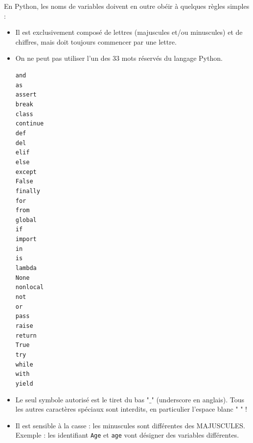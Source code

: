 \documentclass[11pt, a4paper]{book}
\begin{document}
\begin{important}
	En Python, les noms de variables doivent en outre obéir à quelques règles simples :\\
	\begin{itemize}
		\item Il est exclusivement composé de lettres (majuscules  et/ou minuscules) et de chiffres, mais doit toujours	commencer par une lettre.
		\item On ne peut pas utiliser l’un des 33 mots réservés du langage Python.
		\begin{multicols}{7}
			\lstinline{and}\\      \lstinline{as}\\         \lstinline{assert}\\      \lstinline{break}\\       \lstinline{class}\\       \lstinline{continue}\\       \lstinline{def}\\
			\lstinline{del}\\       \lstinline{elif}\\       \lstinline{else}\\        \lstinline{except}\\      \lstinline{False}\\       \lstinline{finally}\\        \lstinline{for}\\
			\lstinline{from}\\      \lstinline{global}\\     \lstinline{if}\\          \lstinline{import}\\      \lstinline{in}\\          \lstinline{is}\\             \lstinline{lambda}\\
			\lstinline{None}\\      \lstinline{nonlocal}\\   \lstinline{not}\\         \lstinline{or}\\          \lstinline{pass}\\        \lstinline{raise}\\          \lstinline{return}\\
			\lstinline{True}\\      \lstinline{try}\\        \lstinline{while}\\     \lstinline{with}\\ \lstinline{yield}
		\end{multicols}	
		\item Le seul symbole autorisé est le tiret du bas "$\_$" (underscore en anglais).
		Tous les autres caractères spéciaux sont interdits, en particulier l’espace blanc " " !
		\item Il est sensible à la casse : les minuscules sont différentes des MAJUSCULES. Exemple : les identifiant \lstinline{Age} et \lstinline{age} vont désigner des variables différentes.
	\end{itemize}
\end{important}
\end{document}
